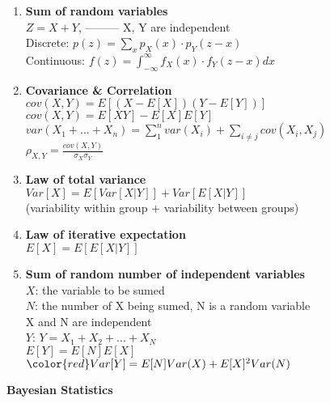 \documentclass[10pt,landscape]{article}
\begin{document}
\begin{multicols}{3}
\begin{enumerate}
	\item \textbf{Sum of random variables}\\
			$Z = X+Y$, --------- X, Y are independent\\
			Discrete: $p(z) = \sum_x p_X(x)\cdot p_Y(z-x)$\\
			Continuous: $f(z) = \int_{-\infty}^\infty f_X(x)\cdot f_Y(z-x) dx $\\
			
	\item \textbf{Covariance \& Correlation}\\
			$cov(X,Y) = E[(X-E[X])(Y-E[Y])]$\\
			$cov(X,Y) = E[XY] - E[X]E[Y]$\\
			$var(X_1+...+X_n) = \sum_1^n var(X_i) + \sum_{i\neq j}cov(X_i,X_j)$\\
			$\rho_{X,Y} = \frac{cov(X,Y)}{\sigma_X \sigma_Y}$\\
			
	\item \textbf{Law of total variance}\\
			$Var[X] = E[Var[X|Y]] + Var[E[X|Y]]$\\
			(variability within group + variability between groups)\\
			
	\item \textbf{Law of iterative expectation}\\
			$E[X] = E[E[X|Y]]$\\
			
	\item \textbf{Sum of random number of independent variables}\\
			$X$: the variable to be sumed\\
			$N$: the number of X being sumed, N is a random variable\\
			X and N are independent\\
			$Y$: $Y = X_1 + X_2 + ... + X_N$\\
			$E[Y] = E[N]E[X]$\\
			$\color{red} Var[Y] = E[N]Var(X) + E[X]^2Var(N)$\\
	
	
\end{enumerate}		
			
			
\begin{center}
     \Large {\textbf{Bayesian Statistics}} \\
\end{center}


\end{multicols}
\end{document}
